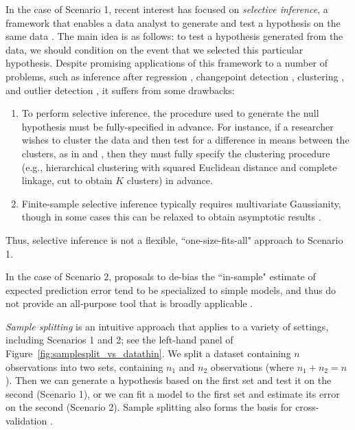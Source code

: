 \documentclass[12pt]{article}
\begin{document}
In the case of Scenario 1, recent interest  has focused on \emph{selective inference}, a framework that enables a data analyst to generate and test a hypothesis on the same data \citep[see, e.g.,][]{taylor2015statistical}. The main idea is as follows: to test a hypothesis generated from the data, we should condition on the event that we selected this particular hypothesis. Despite promising applications of this framework to a number of problems, such as inference after regression \citep{lee2016exact}, changepoint detection \citep{jewell2022testing,hyun2021post}, clustering \citep{gao2020selective,chen2022selective,yun2023selective}, and outlier detection \citep{chen2020valid}, it suffers from some drawbacks: 
\begin{enumerate}
\item To perform selective inference, the  procedure used to generate the null hypothesis must be fully-specified in advance.  For instance, if a researcher wishes to cluster the data and then test for a difference in means between the clusters, as in \cite{gao2020selective} and \cite{chen2022selective}, then they must fully specify the clustering procedure (e.g., hierarchical clustering with squared Euclidean distance and complete linkage, cut to obtain $K$ clusters) in advance. 
\item Finite-sample selective inference typically requires multivariate Gaussianity, though in some cases this can be relaxed to obtain asymptotic results \citep{taylor2018post,tian2017asymptotics,tibshirani2018uniform,tian2018selective}.
\end{enumerate}
Thus, selective inference is not a flexible, ``one-size-fits-all" approach to Scenario 1. 

In the case of Scenario 2, proposals to de-bias the ``in-sample" estimate of expected prediction error  tend to be specialized to simple models, and thus do not provide an all-purpose tool that is broadly applicable \citep{oliveira2021unbiased}.

\emph{Sample splitting} \citep{cox1975note} is an intuitive  approach that applies to a variety of settings, including Scenarios 1 and 2; see the left-hand panel of Figure~\ref{fig:samplesplit_vs_datathin}. We split a dataset containing $n$ observations into two sets, containing $n_1$ and $n_2$ observations (where $n_1+n_2=n$). Then we can generate a hypothesis based on the first set and test it on the second (Scenario 1), or we can fit a model to the first set and estimate its error on the second (Scenario 2). Sample splitting also forms the basis for cross-validation \citep{hastie2009elements}. 
\end{document}
